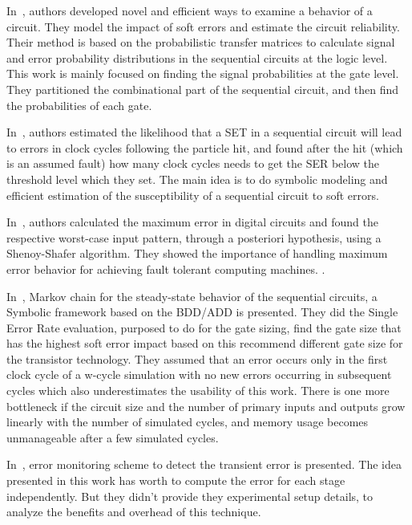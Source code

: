 In~\citep{yu2010scalable}, authors developed novel and efficient ways to examine a behavior of a circuit. They model the impact of soft errors and estimate the circuit reliability. Their method is based on the probabilistic transfer matrices to calculate signal and error probability distributions in the
sequential circuits at the logic level. This work is mainly focused on finding the signal probabilities at the gate level. They partitioned the combinational part of the sequential circuit, and then find the probabilities of each gate.


In~\citep{miskov2007mars},  authors estimated the likelihood that a SET in a sequential circuit will lead to errors
in clock cycles following the particle hit, and found after the hit (which is an assumed fault) how many clock
cycles needs to get the SER below the threshold level which they set. The main idea is to do symbolic modeling and efficient estimation of the susceptibility of a sequential circuit to soft errors.




In~\citep{lingasubramanian2010probabilistic}, authors calculated the maximum error in digital circuits and found the respective
worst-case input pattern, through a posteriori hypothesis, using a Shenoy-Shafer algorithm.
They showed the importance of handling maximum error behavior for achieving fault tolerant
computing machines. .

In~\citep{miskov2008modeling}, Markov chain for the steady-state behavior of the sequential circuits, a Symbolic framework
based on the BDD/ADD is presented. They did the Single Error Rate evaluation, purposed to do
for the gate sizing, find the gate size that has the highest soft error impact based on this recommend
different gate size for the transistor technology. They assumed that an error occurs only in the first clock cycle of a w-cycle simulation with
no new errors occurring in subsequent cycles which also underestimates the usability of this work.  There is one more bottleneck if the circuit size and the number of primary
inputs and outputs grow linearly with the number of simulated cycles, and memory usage becomes
unmanageable after a few simulated cycles.
 




In~\citep{das2007monitoring}, error monitoring scheme to detect the transient error is presented. The idea presented in this work has worth to compute the error for each stage
independently. But they didn't provide they experimental setup details, to analyze the benefits and overhead of this technique.

